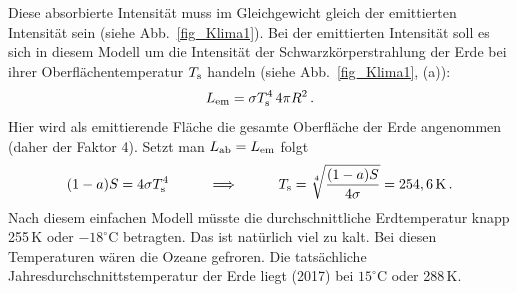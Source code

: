Diese absorbierte Intensit\"at muss im Gleichgewicht gleich der emittierten Intensit\"at
sein (siehe Abb.\ \ref{fig_Klima1}). 
Bei der emittierten Intensit\"at soll es sich in diesem Modell um die Intensit\"at der
Schwarzk\"orperstrahlung der Erde bei ihrer Oberfl\"achentemperatur
$T_{\rm s}$ handeln (siehe Abb.\ \ref{fig_Klima1}, (a)):
\begin{equation}
         L_{\rm em} = \sigma T_{\rm s}^4 \, 4 \pi R^2 \, .
\end{equation}
Hier wird als emittierende Fl\"ache die gesamte Oberfl\"ache der Erde angenommen (daher
der Faktor 4). Setzt man $L_{\rm ab}=L_{\rm em}$ folgt
\begin{equation}
      (1-a) S = 4 \sigma T_{\rm s}^4 \hspace{1cm} \Longrightarrow \hspace{1cm}
          T_{\rm s} = \sqrt[4]{\frac{(1-a) S}{4 \sigma}} = 254,6\,{\rm K} \, .
\end{equation}
Nach diesem einfachen Modell m\"usste die durchschnittliche Erdtemperatur knapp 255\,K oder 
$- 18^\circ$C betragten. Das ist nat\"urlich viel zu kalt. Bei diesen Temperaturen w\"aren die
Ozeane gefroren. Die tats\"achliche Jahresdurchschnittstemperatur der Erde liegt (2017) bei $15^\circ$C
oder 288\,K. 

